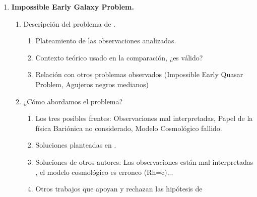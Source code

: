 \begin{enumerate}
	\item \textbf{Impossible Early Galaxy Problem.}
	\begin{enumerate}[{2.}1]
		\item Descripción del problema de \cite{steinhardt2016impossibly}.
		\begin{enumerate}[{2.1.}1]
			\item Plateamiento de las observaciones analizadas.
			\item Contexto teórico usado en la comparación, ¿es válido?
			\item Relación con otros problemas observados (Impossible Early Quasar Problem, Agujeros negros medianos)
		\end{enumerate}
		\item ¿Cómo abordamos el problema?
		\begin{enumerate}[{2.2.}1]
			\item Los tres posibles frentes: Observaciones mal interpretadas, Papel de la física Bariónica no considerado, Modelo Cosmológico fallido.
			\item Soluciones planteadas en \cite{steinhardt2016impossibly}.
			\item Soluciones de otros autores: Las observaciones están mal interpretadas \cite{behroozi2018mostmassive}, el modelo cosmológico es erroneo (Rh=c)...
			\item Otros trabajos que apoyan y rechazan las hipótesis de \cite{steinhardt2016impossibly}
		\end{enumerate}
	\end{enumerate}
	

\end{enumerate}
